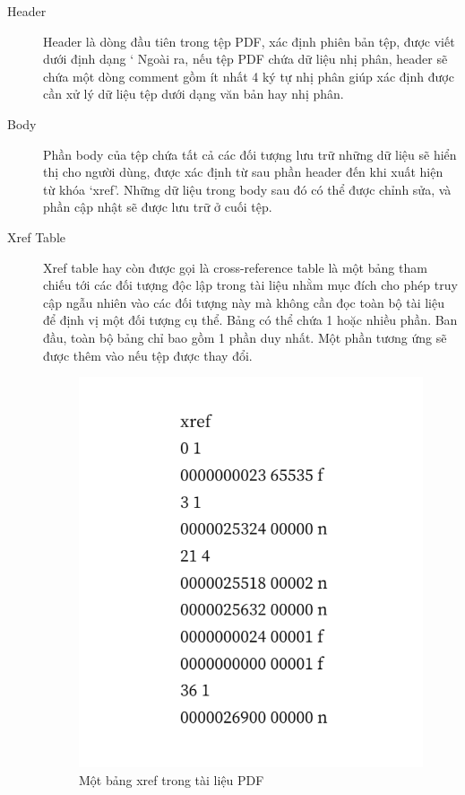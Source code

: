 \documentclass[./../main.tex]{subfiles}
\begin{document}
\begin{description}
	\item[Header]
	      Header là dòng đầu tiên trong tệp PDF, xác định phiên bản tệp, được viết dưới định dạng ‘%
	      Ngoài ra, nếu tệp PDF chứa dữ liệu nhị phân, header sẽ chứa một dòng comment gồm ít nhất 4 ký tự nhị phân giúp xác định được cần xử lý dữ liệu tệp dưới dạng văn bản hay nhị phân.

	\item[Body]
	      Phần body của tệp chứa tất cả các đối tượng lưu trữ những dữ liệu sẽ hiển thị cho người dùng, được xác định từ sau phần header đến khi xuất hiện từ khóa ‘xref’. Những dữ liệu trong body sau đó có thể được chỉnh sửa, và phần cập nhật sẽ được lưu trữ ở cuối tệp.
	\item[Xref Table]
	      Xref table hay còn được gọi là cross-reference table là một bảng tham chiếu tới các đối tượng độc lập trong tài liệu nhằm mục đích cho phép truy cập ngẫu nhiên vào các đối tượng này mà không cần đọc toàn bộ tài liệu để định vị một đối tượng cụ thể.
	      Bảng có thể chứa 1 hoặc nhiều phần. Ban đầu, toàn bộ bảng chỉ bao gồm 1 phần duy nhất. Một phần tương ứng sẽ được thêm vào nếu tệp được thay đổi.
	      \begin{figure}[ht!]
		      \includegraphics[width=\linewidth]{./images/xref_example.png}
		      \caption{Một bảng xref trong tài liệu PDF}
		      \label{fig:xreftable}
	      \end{figure}



\end{description}
\end{document}
